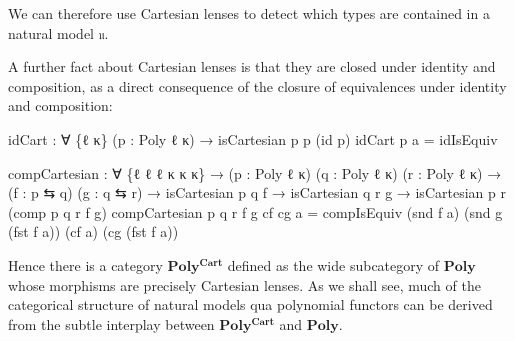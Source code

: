 \documentclass[
  11pt,
  oneside,
  article]{memoir}
\newenvironment{Shaded}{}{}
\newcommand{\NormalTok}[1]{#1}
\newcommand{\OtherTok}[1]{\textcolor[rgb]{0.00,0.44,0.13}{#1}}
\theoremstyle{definition}
\theoremstyle{plain}
\newcommand{\0}{\textsf{0}}
\newcommand{\1}{\tn{\textsf{1}}}
\begin{document}
We can therefore use Cartesian lenses to detect which types are
contained in a natural model \texttt{𝔲}.

A further fact about Cartesian lenses is that they are closed under
identity and composition, as a direct consequence of the closure of
equivalences under identity and composition:

\begin{Shaded}
\begin{Highlighting}[]
\NormalTok{idCart }\OtherTok{:} \OtherTok{∀} \OtherTok{\{}\NormalTok{ℓ κ}\OtherTok{\}} \OtherTok{(}\NormalTok{p }\OtherTok{:}\NormalTok{ Poly ℓ κ}\OtherTok{)}
         \OtherTok{→}\NormalTok{ isCartesian p p }\OtherTok{(}\NormalTok{id p}\OtherTok{)}
\NormalTok{idCart p a }\OtherTok{=}\NormalTok{ idIsEquiv}

\NormalTok{compCartesian }\OtherTok{:} \OtherTok{∀} \OtherTok{\{}\NormalTok{ℓ ℓ\textquotesingle{} ℓ\textquotesingle{}\textquotesingle{} κ κ\textquotesingle{} κ\textquotesingle{}\textquotesingle{}}\OtherTok{\}}
                \OtherTok{→} \OtherTok{(}\NormalTok{p }\OtherTok{:}\NormalTok{ Poly ℓ κ}\OtherTok{)} \OtherTok{(}\NormalTok{q }\OtherTok{:}\NormalTok{ Poly ℓ\textquotesingle{} κ\textquotesingle{}}\OtherTok{)} \OtherTok{(}\NormalTok{r }\OtherTok{:}\NormalTok{ Poly ℓ\textquotesingle{}\textquotesingle{} κ\textquotesingle{}\textquotesingle{}}\OtherTok{)}
                \OtherTok{→} \OtherTok{(}\NormalTok{f }\OtherTok{:}\NormalTok{ p ⇆ q}\OtherTok{)} \OtherTok{(}\NormalTok{g }\OtherTok{:}\NormalTok{ q ⇆ r}\OtherTok{)}
                \OtherTok{→}\NormalTok{ isCartesian p q f }\OtherTok{→}\NormalTok{ isCartesian q r g }
                \OtherTok{→}\NormalTok{ isCartesian p r }\OtherTok{(}\NormalTok{comp p q r f g}\OtherTok{)}
\NormalTok{compCartesian p q r f g cf cg a }\OtherTok{=} 
\NormalTok{    compIsEquiv }\OtherTok{(}\NormalTok{snd f a}\OtherTok{)} \OtherTok{(}\NormalTok{snd g }\OtherTok{(}\NormalTok{fst f a}\OtherTok{))} \OtherTok{(}\NormalTok{cf a}\OtherTok{)} \OtherTok{(}\NormalTok{cg }\OtherTok{(}\NormalTok{fst f a}\OtherTok{))}
\end{Highlighting}
\end{Shaded}

Hence there is a category \(\mathbf{Poly^{Cart}}\) defined as the wide
subcategory of \(\mathbf{Poly}\) whose morphisms are precisely Cartesian
lenses. As we shall see, much of the categorical structure of natural
models qua polynomial functors can be derived from the subtle interplay
between \(\mathbf{Poly^{Cart}}\) and \(\mathbf{Poly}\).
\end{document}
